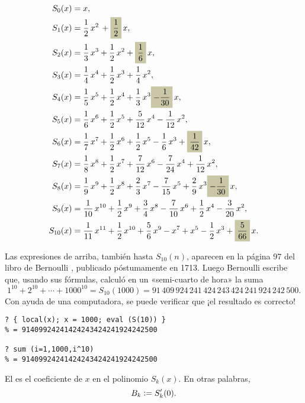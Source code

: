 \documentclass{article}
\numberwithin{equation}{section}
\newcommand{\highlight}[1]{\colorbox{shadecolor}{$\displaystyle #1$}}
\theoremstyle{definition}
\begin{document}
\begin{align*}
  S_0 (x) & = x,\\
  S_1 (x) & = \frac{1}{2}\,x^2\,+\highlight{\frac{1}{2}}\,x,\\
  S_2 (x) & = \frac{1}{3}\,x^3+\frac{1}{2}\,x^2+\highlight{\frac{1}{6}}\,x,\\
  S_3 (x) & = \frac{1}{4}\,x^4+\frac{1}{2}\,x^3+\frac{1}{4}\,x^2,\\
  S_4 (x) & = \frac{1}{5}\,x^5+\frac{1}{2}\,x^4+\frac{1}{3}\,x^3\highlight{-\frac{1}{30}}\,x,\\
  S_5 (x) & = \frac{1}{6}\,x^6+\frac{1}{2}\,x^5+\frac{5}{12}\,x^4-\frac{1}{12}\,x^2,\\
  S_6 (x) & = \frac{1}{7}\,x^7+\frac{1}{2}\,x^6+\frac{1}{2}\,x^5-\frac{1}{6}\,x^3+\highlight{\frac{1}{42}}\,x,\\
  S_7 (x) & = \frac{1}{8}\,x^8+\frac{1}{2}\,x^7+\frac{7}{12}\,x^6-\frac{7}{24}\,x^4+\frac{1}{12}\,x^2,\\
  S_8 (x) & = \frac{1}{9}\,x^9+\frac{1}{2}\,x^8+\frac{2}{3}\,x^7-\frac{7}{15}\,x^5+\frac{2}{9}\,x^3\highlight{-\frac{1}{30}}\,x,\\
  S_9 (x) & = \frac{1}{10}\,x^{10}+\frac{1}{2}\,x^9+\frac{3}{4}\,x^8-\frac{7}{10}\,x^6+\frac{1}{2}\,x^4-\frac{3}{20}\,x^2,\\
  S_{10} (x) & = \frac{1}{11}\,x^{11}+\frac{1}{2}\,x^{10}+\frac{5}{6}\,x^9-x^7+x^5-\frac{1}{2}\,x^3+\highlight{\frac{5}{66}}\,x.
\end{align*}

Las expresiones de arriba, también hasta $S_{10} (n)$, aparecen en la página 97
del libro de Bernoulli \cite{Bernoulli-1713}, publicado póstumamente en
1713. Luego Bernoulli escribe que, usando sus fórmulas, calculó en un
«semi-cuarto de hora» la suma
$$1^{10} + 2^{10} + \cdots + 1000^{10} =
S_{10} (1000) =
91\,409\,924\,241\,424\,243\,424\,241\,924\,242\,500.$$
Con ayuda de una computadora, se puede verificar que ¡el resultado es correcto!

\begin{shaded}
  \small
\begin{verbatim}
? { local(x); x = 1000; eval (S(10)) }
% = 91409924241424243424241924242500

? sum (i=1,1000,i^10)
% = 91409924241424243424241924242500
\end{verbatim}
\end{shaded}

\begin{definicion}
  El  es el coeficiente de $x$ en
  el polinomio $S_k (x)$. En otras palabras,
  $$B_k \mathrel{\mathop:}= S_k' (0).$$
\end{definicion}
\end{document}
